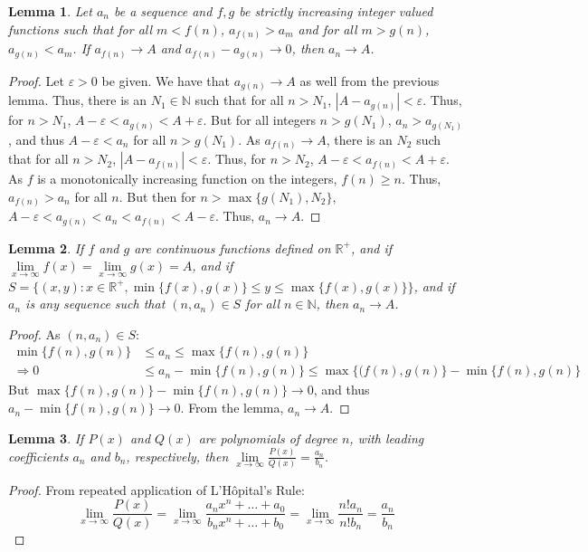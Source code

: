 \documentclass[12pt,oneside]{book}
\theoremstyle{mystyle}
\newtheorem{lemma}{Lemma}[section]
\begin{document}
\begin{lemma}
Let $a_n$ be a sequence and $f,g$ be strictly increasing integer valued functions such that for all $m<f(n)$, $a_{f(n)}>a_m$ and for all $m>g(n)$, $a_{g(n)}<a_m$. If $a_{f(n)}\rightarrow A$ and $a_{f(n)}-a_{g(n)}\rightarrow 0$, then $a_n \rightarrow A$.
\end{lemma}
\begin{proof}
Let $\varepsilon>0$ be given. We have that $a_{g(n)}\rightarrow A$ as well from the previous lemma. Thus, there is an $N_1 \in \mathbb{N}$ such that for all $n>N_1$, $|A-a_{g(n)}|<\varepsilon$. Thus, for $n>N_1$, $A-\varepsilon < a_{g(n)}<A+\varepsilon$. But for all integers $n>g(N_1)$, $a_n >a_{g(N_1)}$, and thus $A-\varepsilon < a_n$ for all $n>g(N_1)$. As $a_{f(n)}\rightarrow A$, there is an $N_2$ such that for all $n>N_2$, $|A-a_{f(n)}|<\varepsilon$. Thus, for $n>N_2$, $A-\varepsilon < a_{f(n)}<A+\varepsilon$. As $f$ is a monotonically increasing function on the integers, $f(n)\geq n$. Thus, $a_{f(n)}>a_n$ for all $n$. But then for $n>\max\{g(N_1),N_2\}$, $A-\varepsilon < a_{g(n)} < a_n < a_{f(n)}<A-\varepsilon$. Thus, $a_n \rightarrow A$.
\end{proof}
%
\begin{lemma}
If $f$ and $g$ are continuous functions defined on $\mathbb{R}^+$, and if $\underset{x\rightarrow \infty}\lim f(x) = \underset{x\rightarrow \infty}\lim g(x)=A$, and if $S = \{(x,y):x\in \mathbb{R}^+,\min\{f(x),g(x)\}\leq y \leq \max\{f(x),g(x)\}\}$, and if $a_n$ is any sequence such that $(n,a_n)\in S$ for all $n\in \mathbb{N}$, then $a_n \rightarrow A$.
\end{lemma}
\begin{proof}
As $(n,a_n)\in S$:
%
\begin{align*}
    \min\{f(n),g(n)\} &\leq a_n \leq \max\{f(n),g(n)\}\\
    \Rightarrow 0 &\leq a_n - \min\{f(n),g(n)\} \leq \max\{(f(n),g(n)\}-\min\{f(n),g(n)\}    
\end{align*}
%
But $\max\{f(n),g(n)\}-\min\{f(n),g(n)\} \rightarrow 0$, and thus $a_n - \min\{f(n),g(n)\} \rightarrow 0$. From the lemma, $a_n \rightarrow A$.
\end{proof}
%
\begin{lemma}
If $P(x)$ and $Q(x)$ are polynomials of degree $n$, with leading coefficients $a_n$ and $b_n$, respectively, then $\underset{x\rightarrow \infty}\lim \frac{P(x)}{Q(x)} = \frac{a_n}{b_n}$.
\end{lemma}
\begin{proof}
From repeated application of L'H\^{o}pital's Rule:
%
\begin{equation*}
    \underset{x\rightarrow \infty}\lim \frac{P(x)}{Q(x)} = \underset{x\rightarrow \infty}\lim \frac{a_n x^n + \hdots + a_0}{b_n x^n + \hdots + b_0} = \underset{x\rightarrow \infty} \lim\frac{n! a_n}{n! b_n} = \frac{a_n}{b_n}
\end{equation*}
\end{proof}
\end{document}
